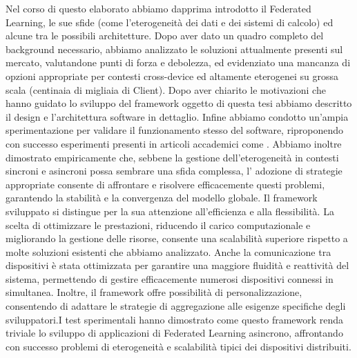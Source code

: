 \documentclass[a4paper, oneside, openright]{report}
\makeatletter
\newcommand\footnoteref[1]{\protected@xdef\@thefnmark{\ref{#1}}\@footnotemark}
\makeatother
\begin{document}
Nel corso di questo elaborato abbiamo dapprima introdotto il Federated Learning, le sue sfide (come l'eterogeneità dei dati e dei sistemi di calcolo) ed alcune tra le possibili architetture. Dopo aver dato un quadro completo del background necessario, abbiamo analizzato le soluzioni attualmente presenti sul mercato, valutandone punti di forza e debolezza, ed evidenziato una mancanza di opzioni appropriate per contesti cross-device ed altamente eterogenei su grossa scala (centinaia di migliaia di Client). Dopo aver chiarito le motivazioni che hanno guidato lo sviluppo del framework\footnoteref{nt:framework} oggetto di questa tesi abbiamo descritto il design e l'architettura software in dettaglio. Infine abbiamo condotto un'ampia sperimentazione per validare il funzionamento stesso del software, riproponendo con successo esperimenti presenti in articoli accademici come \cite{DBLP:journals/corr/abs-1812-06127}. Abbiamo inoltre dimostrato empiricamente  che, sebbene la gestione dell'eterogeneità in contesti sincroni e asincroni possa sembrare una sfida complessa, l’ adozione di strategie appropriate consente di affrontare e risolvere efficacemente questi problemi, garantendo la stabilità e la convergenza del modello globale. Il framework\footnoteref{nt:framework} sviluppato si distingue per la sua attenzione all'efficienza e alla flessibilità. La scelta di ottimizzare le prestazioni, riducendo il carico computazionale e migliorando la gestione delle risorse, consente una scalabilità superiore rispetto a molte soluzioni esistenti che abbiamo analizzato. Anche la comunicazione tra dispositivi è stata ottimizzata per garantire una maggiore fluidità e reattività del sistema, permettendo di gestire efficacemente numerosi dispositivi connessi in simultanea. Inoltre, il framework\footnoteref{nt:framework} offre possibilità di personalizzazione, consentendo di adattare le strategie di aggregazione alle esigenze specifiche degli sviluppatori.I test sperimentali hanno dimostrato come questo framework\footnoteref{nt:framework} renda triviale lo sviluppo di applicazioni di Federated Learning asincrono, affrontando con successo problemi di eterogeneità e scalabilità tipici dei dispositivi distribuiti.
\end{document}
